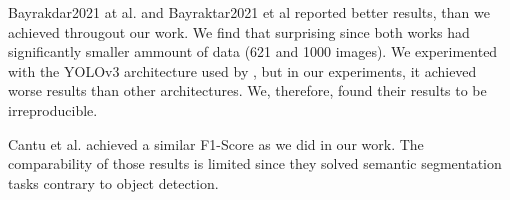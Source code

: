 Bayrakdar2021 at al. \cite{Bayrakdar2021} and Bayraktar2021 et al \cite{Bayraktar2021} reported better results, than we achieved througout our work. We find that surprising since both works had significantly smaller ammount of data (621 and 1000 images). We experimented with the YOLOv3 architecture used by \cite{Bayraktar2021}, but in our experiments, it achieved worse results than other architectures. We, therefore, found their results to be irreproducible.

Cantu et al. achieved a similar F1-Score as we did in our work. The comparability of those results is limited since they solved semantic segmentation tasks contrary to object detection.

